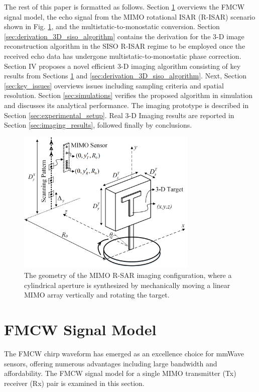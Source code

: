 \documentclass[conference]{IEEEtran}
\begin{document}
		The rest of this paper is formatted as follows. Section \ref{sec:signal_model} overviews the FMCW signal model, the echo signal from the MIMO rotational ISAR (R-ISAR) scenario shown in Fig. \ref{fig:MIMO_R_ISAR_System_Configuration}, and the multistatic-to-monostatic conversion. Section \ref{sec:derivation_3D_siso_algorithm} contains the derivation for the 3-D image reconstruction algorithm in the SISO R-ISAR regime to be employed once the received echo data has undergone multistatic-to-monostatic phase correction. Section IV proposes a novel efficient 3-D imaging algorithm consisting of key results from Sections \ref{sec:signal_model} and \ref{sec:derivation_3D_siso_algorithm}. Next, Section \ref{sec:key_issues} overviews issues including sampling criteria and spatial resolution. Section \ref{sec:simulations} verifies the proposed algorithm in simulation and discusses its analytical performance. The imaging prototype is described in Section \ref{sec:experimental_setup}. Real 3-D Imaging results are reported in Section \ref{sec:imaging_results}, followed finally by conclusions.
		
		\begin{figure}[h]
			\centering
			\includegraphics[width=3.4in]{MIMO_R_ISAR_System_Configuration}
			\caption{The geometry of the MIMO R-SAR imaging configuration, where a cylindrical aperture is synthesized by mechanically moving a linear MIMO array vertically and rotating the target.}
			\label{fig:MIMO_R_ISAR_System_Configuration}
		\end{figure} 
		
		
		\section{FMCW Signal Model}
		\label{sec:signal_model}
		The FMCW chirp waveform has emerged as an excellence choice for mmWave sensors, offering numerous advantages including large bandwidth and affordability. The FMCW signal model for a single MIMO transmitter (Tx) receiver (Rx) pair is examined in this section.
		
\end{document}
